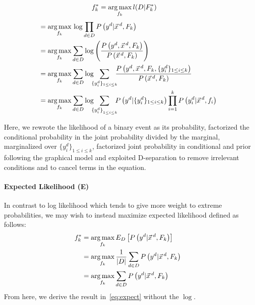 {\small 
\begin{align}
f_k^*&=\argmax_{f_k} l(D|F^*_k) \nonumber
\end{align}
\begin{align}
&=\argmax_{f_k}\,\log\prod_{d\in D}P\left(y^d|\vec{x}^{\,d},F_k\right)\nonumber\\
&=\argmax_{f_k}\sum_{d\in D}\log\left(\frac{P\left(y^d,\vec{x}^{\,d},F_k\right)}{P\left(\vec{x}^{\,d},F_k\right)}\right)\nonumber \\
&=\argmax_{f_k}\sum_{d\in D}\log \!\!\! \sum_{\{y_i^d\}_{1\leq i\leq k}} \!\!\! \frac{P\left(y^d,\vec{x}^{\,d}, F_k,\{y_i^d\}_{1\leq i\leq k}\right)}{P\left(\vec{x}^{\,d},F_k\right)}\nonumber\\
&=\argmax_{f_k}\sum_{d\in D}\log \!\!\! \sum_{{\{y_i^d\}}_{1\leq i\leq k}} \!\!\! P\left(y^d|\{y^d_i\}_{1\leq i\leq k}\right) \prod_{i=1}^kP\left(y_i^d|\vec{x}^{\,d},f_i\right) \label{eq:expect} 
\end{align}}

Here, we rewrote the likelihood of a binary event as its probability,
factorized the conditional probability in the joint probability
divided by the marginal, marginalized over $\{y^d_i\}_{1\leq i\leq
  k}$, factorized joint probability in conditional and prior following
the graphical model and exploited D-separation to remove irrelevant
conditions and to cancel terms in the equation.

\paragraph{Expected Likelihood (E)}

In contrast to log likelihood which tends to give more weight to extreme
probabilities, we may wish to instead maximize expected likelihood
defined as follows:
\begin{align*}
f_k^*&=\argmax_{f_k}E_D\left[P\left(y^d|\vec{x}^{\,d},F_k\right)\right]\nonumber\\
&=\argmax_{f_k}\frac{1}{|D|}\sum_{d\in D} P\left(y^d | \vec{x}^{\,d},F_k\right)\nonumber\\
&=\argmax_{f_k} \sum_{d\in D} P\left(y^d | \vec{x}^{\,d},F_k\right)\nonumber
\end{align*}
From here, we derive the result in~\eqref{eq:expect} without the $\log$.

